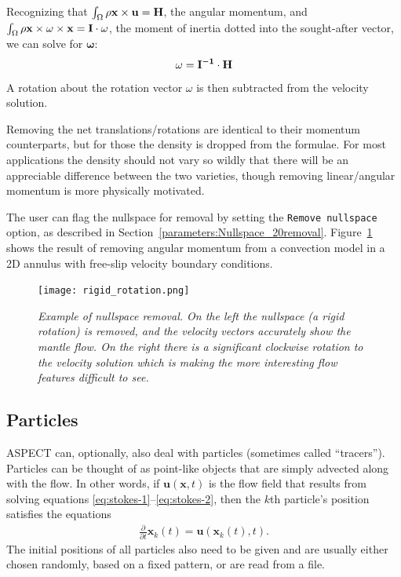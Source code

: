 \documentclass{article}
\newcommand{\aspect}{\textsc{ASPECT}}
\begin{document}
Recognizing that $\int_\Omega \rho {\bf x \times u} = {\bf H}$, the angular momentum, 
and $\int_\Omega \rho {\bf x \times {\mathbf \omega} \times x} = {\bf I \cdot {\mathbf \omega} }$, 
the moment of inertia dotted into the sought-after vector, we can solve for ${\mathbf \omega}$: 
\begin{equation*}
{\mathbf \omega} = {\bf I^{-1} \cdot H}
\end{equation*}
A rotation about the rotation vector $\omega$ is then subtracted from the velocity solution.

Removing the net translations/rotations are identical to their momentum counterparts, but for those the 
density is dropped from the formulae. For most applications the density should not vary so wildly 
that there will be an appreciable difference between the two varieties, 
though removing linear/angular momentum is more physically motivated.

The user can flag the nullspace for removal by setting the \texttt{Remove nullspace} option,
as described in Section~\ref{parameters:Nullspace_20removal}.
Figure~\ref{fig:rigid_rotation} shows the result of removing angular momentum from a convection 
model in a 2D annulus with free-slip velocity boundary conditions. 

\begin{figure}[tbp]
  \centering
  \texttt{[image: rigid\_rotation.png]}
  \caption{\it Example of nullspace removal. 
On the left the nullspace (a rigid rotation) is removed, and the velocity vectors accurately 
show the mantle flow. On the right there is a significant clockwise rotation to the velocity 
solution which is making the more interesting flow features difficult to see. }
  \label{fig:rigid_rotation}
\end{figure}


\subsection{Particles}
\label{sec:particles}

\aspect{} can, optionally, also deal with particles (sometimes called
``tracers''). Particles can be thought of as point-like objects that are simply
advected along with the flow. In other words, if $\mathbf u(\mathbf x,t)$ is the
flow field that results from solving equations
\eqref{eq:stokes-1}--\eqref{eq:stokes-2}, then the $k$th particle's position
satisfies the equations
\begin{align}
  \frac{\partial}{\partial t} \mathbf x_k(t)
  = \mathbf u(\mathbf x_k(t),t).
\end{align}
The initial positions of all particles also need to be given and are usually
either chosen randomly, based on a fixed pattern, or are read from a file.
\end{document}
